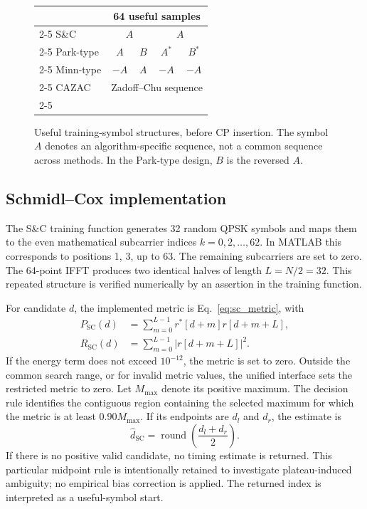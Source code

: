 \begin{figure}[htbp]
\centering
\small
\setlength{\tabcolsep}{4pt}
\begin{tabular}{l|c|c|c|c|}
\multicolumn{1}{c}{}&\multicolumn{4}{c}{64 useful samples}\\ \cline{2-5}
S\&C & \multicolumn{2}{c|}{$A$} & \multicolumn{2}{c|}{$A$}\\ \cline{2-5}
Park-type & $A$ & $B$ & $A^*$ & $B^*$\\ \cline{2-5}
Minn-type & $-A$ & $A$ & $-A$ & $-A$\\ \cline{2-5}
CAZAC & \multicolumn{4}{c|}{Zadoff--Chu sequence}\\ \cline{2-5}
\end{tabular}
\caption{Useful training-symbol structures, before CP insertion. The symbol $A$ denotes an algorithm-specific sequence, not a common sequence across methods. In the Park-type design, $B$ is the reversed $A$.}
\label{fig:method_preambles}
\end{figure}

\subsection{Schmidl--Cox implementation}
The S\&C training function generates 32 random QPSK symbols and maps them to the even mathematical subcarrier indices $k=0,2,\ldots,62$. In MATLAB this corresponds to positions 1, 3, up to 63. The remaining subcarriers are set to zero. The 64-point IFFT produces two identical halves of length $L=N/2=32$. This repeated structure is verified numerically by an assertion in the training function.

For candidate $d$, the implemented metric is Eq.~\eqref{eq:sc_metric}, with
\begin{align}
 P_{\mathrm{SC}}(d)&=\sum_{m=0}^{L-1}r^*[d+m]r[d+m+L],\\
 R_{\mathrm{SC}}(d)&=\sum_{m=0}^{L-1}|r[d+m+L]|^2.
\end{align}
If the energy term does not exceed $10^{-12}$, the metric is set to zero. Outside the common search range, or for invalid metric values, the unified interface sets the restricted metric to zero. Let $M_{\max}$ denote its positive maximum. The decision rule identifies the contiguous region containing the selected maximum for which the metric is at least $0.90M_{\max}$. If its endpoints are $d_l$ and $d_r$, the estimate is
\begin{equation}
 \hat d_{\mathrm{SC}}=\operatorname{round}\left(\frac{d_l+d_r}{2}\right).
\end{equation}
If there is no positive valid candidate, no timing estimate is returned. This particular midpoint rule is intentionally retained to investigate plateau-induced ambiguity; no empirical bias correction is applied. The returned index is interpreted as a useful-symbol start.

